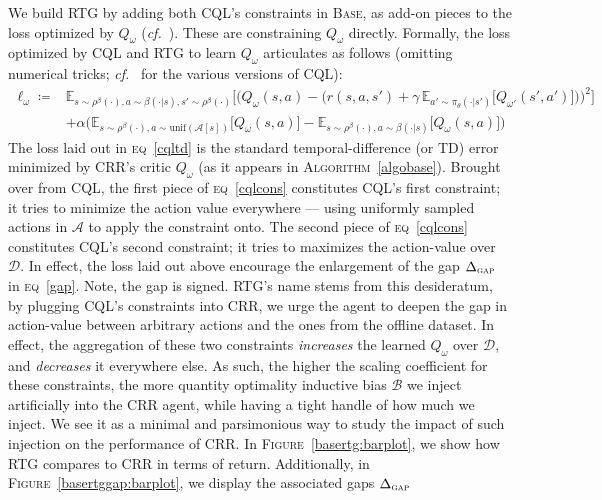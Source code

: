 We build RTG by adding both CQL's constraints in \textsc{Base}, as
add-on pieces to the loss optimized by $Q_\omega$ (\textit{cf.}~\cite{Kumar2020-zb}).
These are constraining $Q_\omega$ directly.
Formally, the loss optimized by CQL and RTG to learn $Q_\omega$ articulates as follows
(omitting numerical tricks; \textit{cf.}~\cite{Kumar2020-zb} for the various versions of CQL):
\begin{align}
\ell_\omega
\coloneqq
&\mathbb{E}_{s \sim \rho^\beta(\cdot), a \sim \beta(\cdot | s), s' \sim \rho^\beta(\cdot)}
\bigg[
\Big(
Q_\omega(s,a) -
\big(
r(s, a, s') + \gamma \, \mathbb{E}_{a' \sim \pi_\theta(\cdot | s')}
\big[
Q_{\omega'}(s',a')
\big]
\big)
\Big)^2
\bigg]
\label{cqltd}
\\
&+ \alpha
\Big(
\mathbb{E}_{s \sim \rho^\beta(\cdot), a \sim \text{unif}(\mathcal{A}[s])}
\big[
Q_\omega(s,a)
\big]
-
\mathbb{E}_{s \sim \rho^\beta(\cdot), a \sim \beta(\cdot | s)}
\big[
Q_\omega(s,a)
\big]
\Big)
\label{cqlcons}
\end{align}
The loss laid out in \textsc{eq}~\ref{cqltd} is the standard temporal-difference (or TD) error minimized
by CRR's critic $Q_\omega$ (as it appears in \textsc{Algorithm}~\ref{algobase}).
Brought over from CQL, the first piece of \textsc{eq}~\ref{cqlcons}
constitutes CQL's first constraint; it
tries to minimize the action value everywhere --- using uniformly sampled actions in $\mathcal{A}$
to apply the constraint onto.
The second piece of \textsc{eq}~\ref{cqlcons}
constitutes CQL's second constraint; it
tries to maximizes the action-value over $\mathcal{D}$.
In effect, the loss laid out above
encourage the enlargement of the gap $\Delta_\textsc{gap}$ in \textsc{eq}~\ref{gap}.
Note, the gap  is signed.
RTG's name stems from this desideratum, by plugging CQL's constraints into CRR,
we urge the agent to deepen the gap in action-value between arbitrary actions and the ones from the offline dataset.
In effect, the aggregation of these two constraints \textit{increases} the learned $Q_\omega$ over $\mathcal{D}$,
and \textit{decreases} it everywhere else.
As such, the higher the scaling coefficient for these constraints, the more quantity optimality inductive bias
$\mathcal{B}$ we inject artificially into the CRR agent, while having a tight handle of how much we inject.
We see it as a minimal and parsimonious way to study the impact of such injection on the performance of CRR.
In \textsc{Figure}~\ref{basertg:barplot}, we show how RTG compares to CRR in terms of return.
Additionally, in \textsc{Figure}~\ref{basertggap:barplot}, we display the associated gaps $\Delta_\textsc{gap}$
